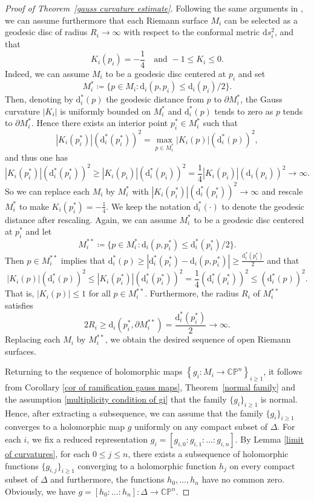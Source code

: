 \documentclass[english, 12pt]{amsart}
\theoremstyle{plain}
\theoremstyle{remark}
\numberwithin{equation}{section}
\theoremstyle{plain}
\theoremstyle{named}
\begin{document}
\begin{proof}[Proof of Theorem~\ref{gauss curvature estimate}]
	Following the same arguments in \cite[~p.465]{Chen-Li-Liu-Ru21}, we can assume furthermore that each Riemann surface $M_i$ can be selected as a geodesic disc of radius $R_i\to \infty$ with respect to the conformal metric $\mathrm{d}s_i^2$, and that
	\[
	K_i(p_i)=-\frac{1}{4}\quad\text{and}\,\, -1\leq K_i\leq 0.
	\]
	Indeed, we can assume $M_i$ to be a geodesic disc centered at $p_i$ and set \[
	M_i^* \coloneq \{p \in M_i : \mathrm{d}_i(p, p_i) \leq \mathrm{d}_i(p_i)/2\}.
	\]
	Then, denoting by \( \mathrm{d}_i^*(p) \) the geodesic distance from \( p \) to \( \partial M_i^* \), the Gauss curvature \(|K_i|\) is uniformly bounded on \( M_i^* \) and \( \mathrm{d}_i^*(p) \) tends to zero as \( p \) tends to \( \partial M_i^* \). Hence there exists an interior point \( p_i^* \in M_i^* \) such that
	\[
	|K_i(p_i^*)|(\mathrm{d}_i^*(p_i^*))^2 = \max_{p \in M_i^*}|K_i(p)|(\mathrm{d}_i^*(p))^2,
	\]
	and thus one has
	\[
	|K_i(p_i^*)|(\mathrm{d}_i^*(p_i^*))^2 \geq |K_i(p_i)|(\mathrm{d}_i^*(p_i))^2 = \frac{1}{4}|K_i(p_i)|(\mathrm{d}_i(p_i))^2 \to \infty.
	\]
	So we can replace each \( M_i \) by \( M_i^* \) with \( |K_i(p_i^*)|\left(\mathrm{d}_i^{*}(p_i^*)\right)^2 \to \infty \) and rescale \( M_i^* \) to make \( K_i(p_i^*) = -\frac{1}{4} \). We keep the notation \( \mathrm{d}_i^*\left(\cdot\right) \) to denote the geodesic distance after rescaling. Again, we can assume \( M_i^* \) to be a geodesic disc centered at \( p_i^* \) and let
	\[
	M_i^{**} \coloneq \{p \in M_i^* : \mathrm{d}_i(p, p_i^*) \leq \mathrm{d}_i^*(p_i^*)/2\}.
	\]
	Then \( p \in M_i^{**} \) implies that \( \mathrm{d}_i^*(p)\geq \left|\mathrm{d}_i^*(p_i^*)- \mathrm{d}_i(p, p_i^*)\right| \geq \frac{\mathrm{d}_i^*(p_i^*)}{2} \) and that
	\[
	|K_i(p)|(\mathrm{d}_i^*(p))^2 \leq |K_i(p_i^*)|(\mathrm{d}_i^*(p_i^*))^2 = \frac{1}{4}(\mathrm{d}_i^*(p_i^*))^2 \leq (\mathrm{d}_i^*(p))^2.
	\]
	That is, \( |K_i(p)| \leq 1 \) for all \( p \in M_i^{**} \). Furthermore, the radius $R_i$ of $M_i^{**}$ satisfies
	\[
	2R_i\geq \mathrm{d}_i(p_i^*, \partial M_i^{**}) = \frac{\mathrm{d}_i^*(p_i^*)}{2} \to \infty. 
	\]
	Replacing each $M_i$ by $M_i^{**}$, we obtain the desired sequence of open Riemann surfaces.
	
	Returning to the sequence of holomorphic maps $\left\{g_i\colon M_i\rightarrow \mathbb{CP}^n\right\}_{i\geq 1}$, it follows from Corollary \ref{cor of ramification gauss maps}, Theorem~\ref{normal family} and the assumption \eqref{multiplicity condition of gi} that the family $\{g_i\}_{i\geq 1}$ is normal. Hence, after extracting a subsequence, we can assume that the family $\{g_i\}_{i\geq 1}$ converges to a holomorphic map $g$ uniformly on any compact subset of $\Delta$. For each $i$, we fix a reduced representation $g_i=[g_{i,0}:g_{i,1}:\dots:g_{i,n}]$. By Lemma \ref{limit of curvatures}, for each $0\leq j\leq n$, there exists a subsequence of holomorphic functions $\{g_{i,j}\}_{i\geq 1}$ converging to a holomorphic function $h_j$ on every compact subset of $\Delta$ and furthermore, the functions $h_0,\dots,h_n$ have no common zero. Obviously, we have $g=[h_0:\dots:h_n]\colon \Delta\to \mathbb{CP}^n$. 
	

\end{proof}
\end{document}
